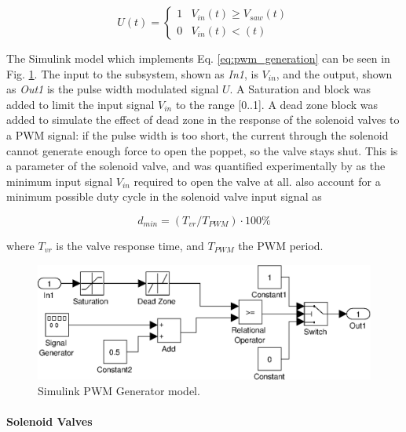\begin{equation}
\label{eq:pwm_generation}
U\left(t\right) = 
\begin{cases}
1 & V_{in}\left(t\right) \geq V_{saw}\left(t\right) \\
0 & V_{in}\left(t\right) < \left(t\right)
\end{cases}
\end{equation}

The Simulink model which implements Eq. \ref{eq:pwm_generation} can be seen in Fig. \ref{fig:pneumatics_pwm}. The input to the subsystem, shown as \emph{In1}, is $V_{in}$, and the output, shown as \emph{Out1} is the pulse width modulated signal $U$. A Saturation and block was added to limit the input signal $V_{in}$ to the range [0..1]. A dead zone block was added to simulate the effect of dead zone in the response of the solenoid valves to a PWM signal: if the pulse width is too short, the current through the solenoid cannot generate enough force to open the poppet, so the valve stays shut. This is a parameter of the solenoid valve, and was quantified experimentally by \cite{valve_models} as the minimum input signal $V_{in}$ required to open the valve at all.  also account for a minimum possible duty cycle in the solenoid valve input signal as

\begin{equation}
  \label{eq:pwm_duty_min}
  d_{min}=\left(T_{vr}/T_{PWM}\right)\cdot100\%
\end{equation}

where $T_{vr}$ is the valve response time, and $T_{PWM}$ the PWM period.


\begin{figure}[h]
\centering
\includegraphics[scale=1]{implementation/figures/pneumatic_modelling2.eps}
\caption{Simulink PWM Generator model.}
\label{fig:pneumatics_pwm}
\end{figure}

\paragraph{Solenoid Valves}



